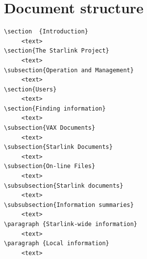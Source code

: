 \documentclass[twoside,11pt]{article}
\newcommand{\xlabel}[1]{}
\begin{document}
\newpage

\section {Document structure\xlabel{document_structure}}

\begin{verbatim}
\section  {Introduction}
     <text>
\section{The Starlink Project}
     <text>
\subsection{Operation and Management}
     <text>
\section{Users}
     <text>
\section{Finding information}
     <text>
\subsection{VAX Documents}
     <text>
\subsection{Starlink Documents}
     <text>
\subsection{On-line Files}
     <text>
\subsubsection{Starlink documents}
     <text>
\subsubsection{Information summaries}
     <text>
\paragraph {Starlink-wide information}
     <text>
\paragraph {Local information}
     <text>

\end{verbatim}
\end{document}
